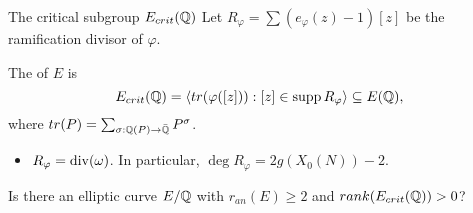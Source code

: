 \documentclass[handout]{beamer}
\begin{document}
\begin{frame}{The critical subgroup $E_{crit}(\mathbb{Q})$}
Let $R_\varphi =  \sum (e_\varphi(z)  -1) [z]$ be the ramification divisor of $\varphi$.

\begin{Def}
The  of $E$ is
\[
	E_{crit}(\mathbb{Q})  = \langle tr(\varphi([z])) : [z] \in \operatorname{supp} R_\varphi \rangle \subseteq E(\mathbb{Q}), 
\] 
where $tr(P) = \sum_{\sigma: \mathbb{Q}(P) \to \bar{\mathbb{Q}}} P^{\sigma}$.
\end{Def}

\pause



\begin{itemize} 
\item $R_\varphi = \operatorname{div}(\omega)$. In particular, $\deg R_{\varphi} = 2g(X_0(N))-2$. \\
\end{itemize}


\begin{question}
Is there an elliptic curve $E/\mathbb{Q}$ with $r_{an}(E) \geq 2$ and $rank(E_{crit}(\mathbb{Q})) >0$?
\end{question}


\end{frame}

\end{document}
